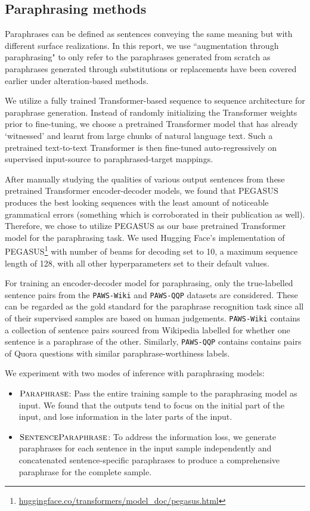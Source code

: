 \documentclass[11pt,a4paper]{article}
\newcommand{\senttfpara}{$\textsc{SentenceParaphrase}$}
\newcommand{\tfpara}{$\textsc{Paraphrase}$}
\begin{document}
\subsection{Paraphrasing methods}
Paraphrases can be defined as sentences conveying the same meaning but with different surface realizations. In this report, we use ``augmentation through paraphrasing" to only refer to the paraphrases generated from scratch as paraphrases generated through substitutions or replacements have been covered earlier under alteration-based methods.

We utilize a fully trained Transformer-based sequence to sequence architecture for paraphrase generation. Instead of randomly initializing the Transformer weights prior to fine-tuning, we choose a pretrained Transformer model that has already `witnessed' and learnt from large chunks of natural language text. Such a pretrained text-to-text Transformer is then fine-tuned auto-regressively on supervised input-source to paraphrased-target mappings.

After manually studying the qualities of various output sentences from these pretrained Transformer encoder-decoder models, we found that PEGASUS produces the best looking sequences with the least amount of noticeable grammatical errors (something which is corroborated in their publication as well). Therefore, we chose to utilize PEGASUS as our base pretrained Transformer model for the paraphrasing task. We used Hugging Face's implementation of PEGASUS\footnote{\url{huggingface.co/transformers/model_doc/pegasus.html}} with number of beams for decoding set to 10, a maximum sequence length of 128, with all other hyperparameters set to their default values.

For training an encoder-decoder model for paraphrasing, only the true-labelled sentence pairs from the \texttt{PAWS-Wiki} and \texttt{PAWS-QQP} datasets are considered. These can be regarded as the gold standard for the paraphrase recognition task since all of their supervised samples are based on human judgements. \texttt{PAWS-Wiki} \cite{paws} contains a collection of sentence pairs sourced from Wikipedia labelled for whether one sentence is a paraphrase of the other. Similarly, \texttt{PAWS-QQP} contains contains pairs of Quora questions with similar paraphrase-worthiness labels.

We experiment with two modes of inference with paraphrasing models:
\begin{itemize}
    \item \tfpara: Pass the entire training sample to the paraphrasing model as input. We found that the outputs tend to focus on the initial part of the input, and lose information in the later parts of the input.
    
    \item \senttfpara: To address the information loss, we generate paraphrases for each sentence in the input sample independently and concatenated sentence-specific paraphrases to produce a comprehensive paraphrase for the complete sample.
\end{itemize}
\end{document}
